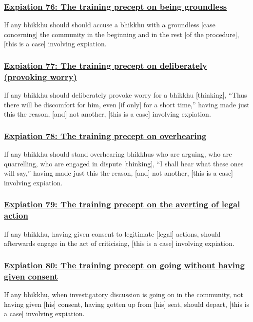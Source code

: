 \subsubsection*{\hyperref[pac76]{Expiation 76: The training precept on being groundless}}
\label{exp76}
If any bhikkhu should should accuse a bhikkhu with a groundless [case concerning] the community in the beginning and in the rest [of the procedure], [this is a case] involving expiation.



\subsubsection*{\hyperref[pac77]{Expiation 77: The training precept on deliberately (provoking worry)}}
\label{exp77}
If any bhikkhu should deliberately provoke worry for a bhikkhu [thinking], ``Thus there will be discomfort for him, even [if only] for a short time,'' having made just this the reason, [and] not another, [this is a case] involving expiation.



\subsubsection*{\hyperref[pac78]{Expiation 78: The training precept on overhearing}}
\label{exp78}
If any bhikkhu should stand overhearing bhikkhus who are arguing, who are quarrelling, who are engaged in dispute [thinking], ``I shall hear what these ones will say,'' having made just this the reason, [and] not another, [this is a case] involving expiation.



\subsubsection*{\hyperref[pac79]{Expiation 79: The training precept on the averting of legal action}}
\label{exp79}
If any bhikkhu, having given consent to legitimate [legal] actions, should afterwards engage in the act of criticising, [this is a case] involving expiation.



\subsubsection*{\hyperref[pac80]{Expiation 80: The training precept on going without having given consent}}
\label{exp80}
If any bhikkhu, when investigatory discussion is going on in the community, not having given [his] consent, having gotten up from [his] seat, should depart, [this is a case] involving expiation.



